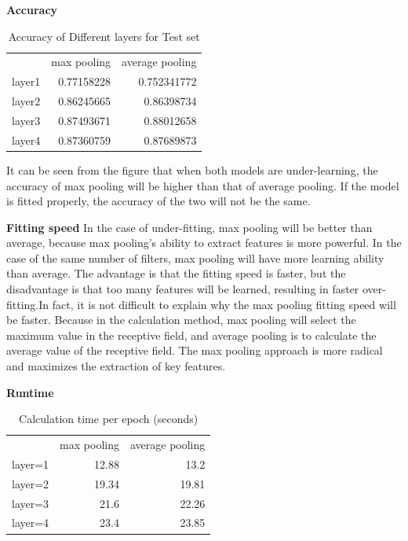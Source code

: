 \documentclass{article}
\begin{document}
\textbf{Accuracy}

\begin{table}[htbp]
  \centering
  \caption{Accuracy of Different layers for Test set}
    \begin{tabular}{lrr}
          & \multicolumn{1}{l}{max pooling} & \multicolumn{1}{l}{average pooling} \\
    layer1 & 0.77158228 & 0.752341772 \\
    layer2 & 0.86245665 & 0.86398734 \\
    layer3 & 0.87493671 & 0.88012658 \\
    layer4 & 0.87360759 & 0.87689873 \\
    \end{tabular}%
  \label{tab:addlabel}%
\end{table}%


It can be seen from the figure that when both models are under-learning, the accuracy of max pooling will be higher than that of average pooling. If the model is fitted properly, the accuracy of the two will not be the same.

\textbf{Fitting speed}
In the case of under-fitting, max pooling will be better than average, because max pooling's ability to extract features is more powerful. In the case of the same number of filters, max pooling will have more learning ability than average. The advantage is that the fitting speed is faster, but the disadvantage is that too many features will be learned, resulting in faster over-fitting.In fact, it is not difficult to explain why the max pooling fitting speed will be faster. Because in the calculation method, max pooling will select the maximum value in the receptive field, and average pooling is to calculate the average value of the receptive field. The max pooling approach is more radical and maximizes the extraction of key features.

\textbf{Runtime}

\begin{table}[H]
  \centering
  \caption{Calculation time per epoch (seconds)}
    \begin{tabular}{lrr}
          & \multicolumn{1}{l}{max pooling} & \multicolumn{1}{l}{average pooling} \\
    layer=1 & 12.88 & 13.2 \\
    layer=2 & 19.34 & 19.81 \\
    layer=3 & 21.6  & 22.26 \\
    layer=4 & 23.4  & 23.85 \\
    \end{tabular}%
  \label{tab:addlabel}%
\end{table}%
\end{document}
